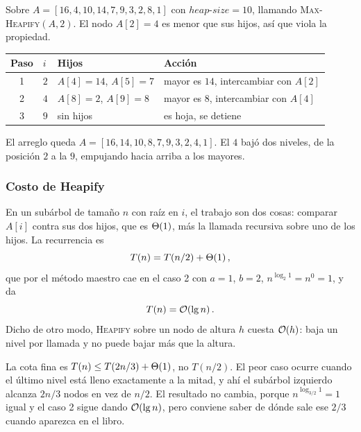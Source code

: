 \documentclass[11pt,letterpaper]{article}
\begin{document}
\begin{ejemplo}
  Sobre $A = [16, 4, 10, 14, 7, 9, 3, 2, 8, 1]$ con
  $\mathit{heap\text{-}size} = 10$, llamando
  \textsc{Max-Heapify}$(A, 2)$. El nodo $A[2] = 4$ es menor que sus
  hijos, así que viola la propiedad.

  \begin{center}
  \begin{tabular}{clll}
    \toprule
    \textbf{Paso} & \textbf{$i$} & \textbf{Hijos}
      & \textbf{Acción} \\
    \midrule
    1 & $2$ & $A[4] = 14$, $A[5] = 7$
        & mayor es $14$, intercambiar con $A[2]$ \\
    2 & $4$ & $A[8] = 2$, $A[9] = 8$
        & mayor es $8$, intercambiar con $A[4]$ \\
    3 & $9$ & sin hijos
        & es hoja, se detiene \\
    \bottomrule
  \end{tabular}
  \end{center}

  El arreglo queda $A = [16, 14, 10, 8, 7, 9, 3, 2, 4, 1]$. El $4$
  bajó dos niveles, de la posición $2$ a la $9$, empujando hacia
  arriba a los mayores.
\end{ejemplo}

\subsubsection*{Costo de Heapify}

En un subárbol de tamaño $n$ con raíz en $i$, el trabajo son dos
cosas: comparar $A[i]$ contra sus dos hijos, que es $\Theta\!\left(1\right)$, más la
llamada recursiva sobre uno de los hijos. La recurrencia es
\[
    T(n) = T(n/2) + \Theta\!\left(1\right) ,
\]
que por el método maestro cae en el caso 2 con $a = 1$, $b = 2$,
$n^{\log_2 1} = n^0 = 1$, y da
\[
    T(n) = \mathcal{O}\!\left(\lg n\right) .
\]
Dicho de otro modo, \textsc{Heapify} sobre un nodo de altura $h$
cuesta $\mathcal{O}\!\left(h\right)$: baja un nivel por llamada y no puede bajar más que
la altura.

\begin{observacion}
  La cota fina es $T(n) \leq T(2n/3) + \Theta\!\left(1\right)$, no $T(n/2)$. El peor
  caso ocurre cuando el último nivel está lleno exactamente a la
  mitad, y ahí el subárbol izquierdo alcanza $2n/3$ nodos en vez de
  $n/2$. El resultado no cambia, porque
  $n^{\log_{3/2} 1} = 1$ igual y el caso 2 sigue dando
  $\mathcal{O}\!\left(\lg n\right)$, pero conviene saber de dónde sale ese $2/3$ cuando
  aparezca en el libro.
\end{observacion}
\end{document}
